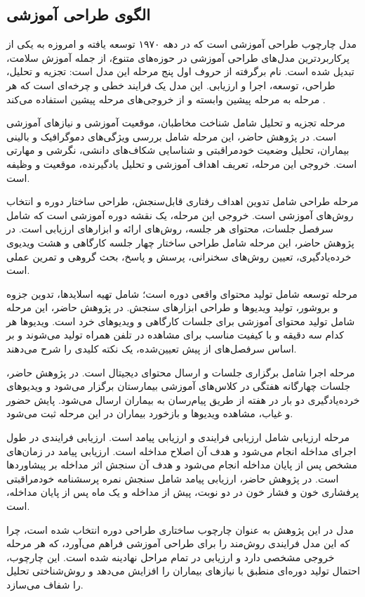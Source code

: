 \subsection{الگوی طراحی آموزشی }
مدل  چارچوب طراحی آموزشی است که در دهه ۱۹۷۰ توسعه یافته و امروزه به یکی از پرکاربردترین مدل‌های طراحی آموزشی در حوزه‌های متنوع، از جمله آموزش سلامت، تبدیل شده است. نام  برگرفته از حروف اول پنج مرحله این مدل است: تجزیه و تحلیل، طراحی، توسعه، اجرا و ارزیابی. این مدل یک فرایند خطی و چرخه‌ای است که هر مرحله به مرحله پیشین وابسته و از خروجی‌های مرحله پیشین استفاده می‌کند \cite{branch2009addie}.
\par
مرحله تجزیه و تحلیل شامل شناخت مخاطبان، موقعیت آموزشی و نیازهای آموزشی است. در پژوهش حاضر، این مرحله شامل بررسی ویژگی‌های دموگرافیک و بالینی بیماران، تحلیل وضعیت خودمراقبتی و شناسایی شکاف‌های دانشی، نگرشی و مهارتی است. خروجی این مرحله، تعریف اهداف آموزشی و تحلیل یادگیرنده، موقعیت و وظیفه است.
\par
مرحله طراحی شامل تدوین اهداف رفتاری قابل‌سنجش، طراحی ساختار دوره و انتخاب روش‌های آموزشی است. خروجی این مرحله، یک نقشه دوره آموزشی است که شامل سرفصل جلسات، محتوای هر جلسه، روش‌های ارائه و ابزارهای ارزیابی است. در پژوهش حاضر، این مرحله شامل طراحی ساختار چهار جلسه کارگاهی و هشت ویدیوی خرده‌یادگیری، تعیین روش‌های سخنرانی، پرسش و پاسخ، بحث گروهی و تمرین عملی است.
\par
مرحله توسعه شامل تولید محتوای واقعی دوره است؛ شامل تهیه اسلایدها، تدوین جزوه و بروشور، تولید ویدیوها و طراحی ابزارهای سنجش. در پژوهش حاضر، این مرحله شامل تولید محتوای آموزشی برای جلسات کارگاهی و ویدیوهای خرد است. ویدیوها هر کدام سه دقیقه و با کیفیت مناسب برای مشاهده در تلفن همراه تولید می‌شوند و بر اساس سرفصل‌های از پیش تعیین‌شده، یک نکته کلیدی را شرح می‌دهند.
\par
مرحله اجرا شامل برگزاری جلسات و ارسال محتوای دیجیتال است. در پژوهش حاضر، جلسات چهارگانه هفتگی در کلاس‌های آموزشی بیمارستان برگزار می‌شود و ویدیوهای خرده‌یادگیری دو بار در هفته از طریق پیام‌رسان به بیماران ارسال می‌شود. پایش حضور و غیاب، مشاهده ویدیوها و بازخورد بیماران در این مرحله ثبت می‌شود.
\par
مرحله ارزیابی شامل ارزیابی فرایندی و ارزیابی پیامد است. ارزیابی فرایندی در طول اجرای مداخله انجام می‌شود و هدف آن اصلاح مداخله است. ارزیابی پیامد در زمان‌های مشخص پس از پایان مداخله انجام می‌شود و هدف آن سنجش اثر مداخله بر پیشاوردها است. در پژوهش حاضر، ارزیابی پیامد شامل سنجش نمره پرسشنامه خودمراقبتی پرفشاری خون و فشار خون در دو نوبت، پیش از مداخله و یک ماه پس از پایان مداخله، است.
\par
مدل  در این پژوهش به عنوان چارچوب ساختاری طراحی دوره انتخاب شده است، چرا که این مدل فرایندی روش‌مند را برای طراحی آموزشی فراهم می‌آورد، که هر مرحله خروجی مشخصی دارد و ارزیابی در تمام مراحل نهادینه شده است. این چارچوب، احتمال تولید دوره‌ای منطبق با نیازهای بیماران را افزایش می‌دهد و روش‌شناختی تحلیل را شفاف می‌سازد.

